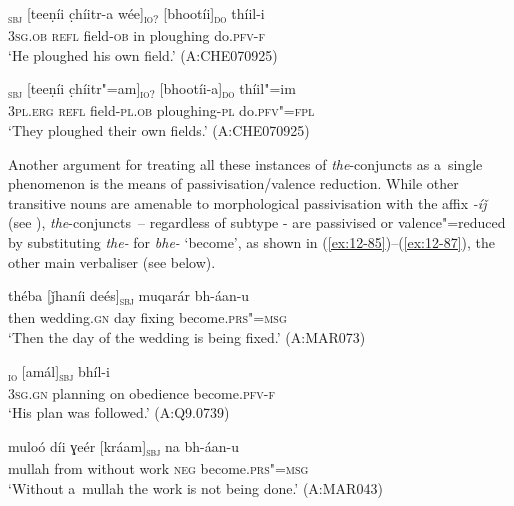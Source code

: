 \begin{exe}
\ex
\label{ex:12-83}
\gll [tíi]\textsubscript{\textsc{sbj}} [teeṇíi c̣híitr-a wée]\textsubscript{\textsc{io?}} [bhootíi]\textsubscript{\textsc{do}} thíil-i  \\
\textsc{3sg.ob} \textsc{refl} field-\textsc{ob} in ploughing do.\textsc{pfv-f} \\
\glt `He ploughed his own field.' (A:CHE070925)
\end{exe}
\begin{exe}
\ex
\label{ex:12-84}
\gll [taním]\textsubscript{\textsc{sbj}} [teeṇíi c̣híitr"=am]\textsubscript{\textsc{io?}} [bhootíi-a]\textsubscript{\textsc{do}} thíil"=im  \\
\textsc{3pl.erg} \textsc{refl} field-\textsc{pl.ob} ploughing-\textsc{pl} do.\textsc{pfv"=fpl} \\
\glt `They ploughed their own fields.' (A:CHE070925)
\end{exe}

Another argument for treating all these instances of \textit{the}-conjuncts as a~single phenomenon is the means of passivisation/valence reduction. While other transitive nouns are amenable to morphological passivisation with the affix \textit{-íǰ} (see ), \textit{the}-conjuncts~-- regardless of subtype - are passivised or valence"=reduced by substituting \textit{the-} for \textit{bhe-} `become', as shown in (\ref{ex:12-85})--(\ref{ex:12-87}), the other main verbaliser (see below).

\begin{exe}
\ex
\label{ex:12-85}
\gll théba [ǰhaníi deés]\textsubscript{\textsc{sbj}} muqarár bh-áan-u  \\
then wedding.\textsc{gn} day fixing become.\textsc{prs"=msg} \\
\glt `Then the day of the wedding is being fixed.' (A:MAR073)
\end{exe}
\begin{exe}
\ex
\label{ex:12-86}
\textsubscript{\textsc{io}}
     [amál]\textsubscript{\textsc{sbj}} bhíl-i  \\
\textsc{3sg.gn} planning on obedience become.\textsc{pfv-f} \\
\glt `His plan was followed.' (A:Q9.0739)
\end{exe}
\begin{exe}
\ex
\label{ex:12-87}
\gll muloó díi ɣeér [kráam]\textsubscript{\textsc{sbj}} na bh-áan-u  \\
mullah from without work \textsc{neg} become.\textsc{prs"=msg} \\
\glt `Without a~mullah the work is not being done.' (A:MAR043)
\end{exe}

